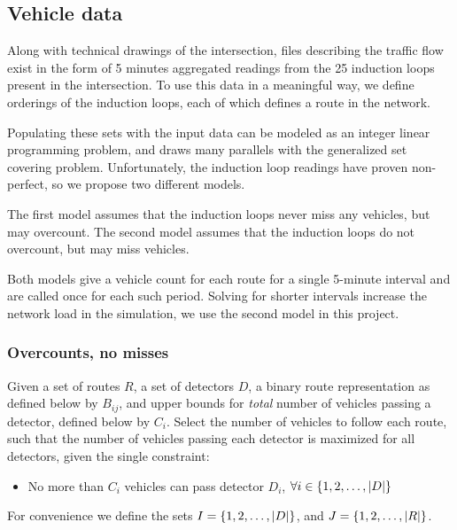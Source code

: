 \subsection{Vehicle data}

Along with technical drawings of the intersection, files describing the traffic flow exist in the form of 5 minutes aggregated readings from the 25 induction loops present in the intersection.
To use this data in a meaningful way, we define orderings of the induction loops, each of which defines a route in the network. 

Populating these sets with the input data can be modeled as an integer linear programming problem, and draws many parallels with the generalized set covering problem.
Unfortunately, the induction loop readings have proven non-perfect, so we propose two different models.

The first model assumes that the induction loops never miss any vehicles, but may overcount.
The second model assumes that the induction loops do not overcount, but may miss vehicles. 

Both models give a vehicle count for each route for a single 5-minute interval and are called once for each such period.
Solving for shorter intervals increase the network load in the simulation, we use the second model in this project.

\subsubsection{Overcounts, no misses}
Given a set of routes $R$, a set of detectors $D$, a binary route representation as defined below by $B_{ij}$, and upper bounds for \textit{total} number of vehicles passing a detector, defined below by $C_i$. 
Select the number of vehicles to follow each route, such that the number of vehicles passing each detector is maximized for all detectors, given the single constraint:
\begin{itemize}
  \item No more than $C_i$ vehicles can pass detector $D_i$, $\forall i \in \left\{1, 2, \ldots, |D|\right\}$
\end{itemize}

For convenience we define the sets $I = \left\{1, 2, \ldots, |D|\right\}$, and $J = \left\{1, 2, \ldots, |R|\right\}$.


